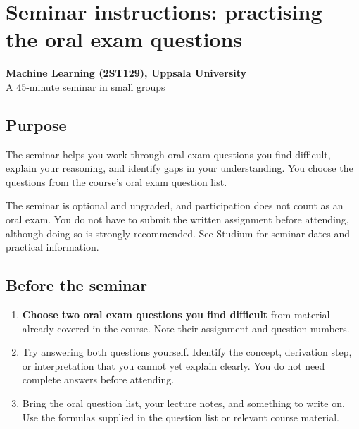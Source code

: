 \documentclass[11pt,a4paper]{article}
\begin{document}
\section*{Seminar instructions: practising the oral exam questions}
\textbf{Machine Learning (2ST129), Uppsala University}\\
A 45-minute seminar in small groups

\subsection*{Purpose}
The seminar helps you work through oral exam questions you find difficult, explain your reasoning, and identify gaps in your understanding. You choose the questions from the course's \href{https://github.com/MansMeg/IntroML/blob/master/oral_exam/oral_exam_q.pdf}{oral exam question list}.

The seminar is optional and ungraded, and participation does not count as an oral exam. You do not have to submit the written assignment before attending, although doing so is strongly recommended. See Studium for seminar dates and practical information.

\subsection*{Before the seminar}
\begin{enumerate}
\item \textbf{Choose two oral exam questions you find difficult} from material already covered in the course. Note their assignment and question numbers.
\item Try answering both questions yourself. Identify the concept, derivation step, or interpretation that you cannot yet explain clearly. You do not need complete answers before attending.
\item Bring the oral question list, your lecture notes, and something to write on. Use the formulas supplied in the question list or relevant course material.
\end{enumerate}
\end{document}
